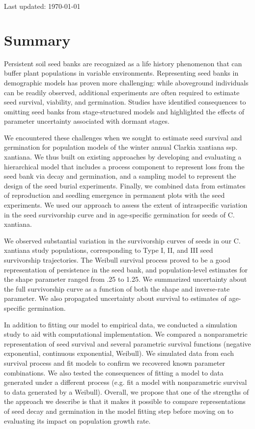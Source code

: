 \documentclass[12pt, oneside, titlepage]{article}   	%
\begin{document}
Last updated: \today

\iffalse

\section{Summary}

Persistent soil seed banks are recognized as a life history phenomenon that can buffer plant populations in variable environments. Representing seed banks in demographic models has proven more challenging: while aboveground individuals can be readily observed, additional experiments are often required to estimate seed survival, viability, and germination. Studies have identified consequences to omitting seed banks from stage-structured models and highlighted the effects of parameter uncertainty associated with dormant stages. 

We encountered these challenges when we sought to estimate seed survival and germination for population models of the winter annual Clarkia xantiana ssp. xantiana. We thus built on existing approaches by developing and evaluating a hierarchical model that includes a process component to represent loss from the seed bank via decay and germination, and a sampling model to represent the design of the seed burial experiments. Finally, we combined data from estimates of reproduction and seedling emergence in permanent plots with the seed experiments. We used our approach to assess the extent of intraspecific variation in the seed survivorship curve and in age-specific germination for seeds of C. xantiana.

We observed substantial variation in the survivorship curves of seeds in our C. xantiana study populations, corresponding to Type I, II, and III seed survivorship trajectories. The Weibull survival process proved to be a good representation of persistence in the seed bank, and population-level estimates for the shape parameter ranged from .25 to 1.25. We summarized uncertainty about the full survivorship curve as a function of both the shape and inverse-rate parameter. We also propagated uncertainty about survival to estimates of age-specific germination.

In addition to fitting our model to empirical data, we conducted a simulation study to aid with computational implementation. We compared a nonparametric representation of seed survival and several parametric survival functions (negative exponential, continuous exponential, Weibull). We simulated data from each survival process and fit models to confirm we recovered known parameter combinations. We also tested the consequences of fitting a model to data generated under a different process (e.g. fit a model with nonparametric survival to data generated by a Weibull). Overall, we propose that one of the strengths of the approach we describe is that it makes it possible to compare representations of seed decay and germination in the model fitting step before moving on to evaluating its impact on population growth rate. 
\end{document}
